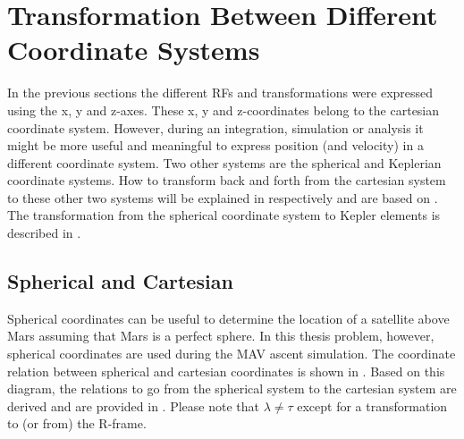 \section{Transformation Between Different Coordinate Systems}
\label{sec:transsys}
In the previous sections the different \ac{RF}s and transformations were expressed using the x, y and z-axes. These x, y and z-coordinates belong to the cartesian coordinate system. However, during an integration, simulation or analysis it might be more useful and meaningful to express position (and velocity) in a different coordinate system. Two other systems are the spherical and Keplerian coordinate systems. How to transform back and forth from the cartesian system to these other two systems will be explained in  respectively and are based on \cite{noomen2013basic}. The transformation from the spherical coordinate system to Kepler elements is described in . 


\subsection{Spherical and Cartesian}
\label{subsec:sphercart}
Spherical coordinates can be useful to determine the location of a satellite above Mars assuming that Mars is a perfect sphere. In this thesis problem, however, spherical coordinates are used during the \ac{MAV} ascent simulation. The coordinate relation between spherical and cartesian coordinates is shown in . Based on this diagram, the relations to go from the spherical system to the cartesian system are derived and are provided in . Please note that $\lambda\neq\tau$ except for a transformation to (or from) the R-frame.



